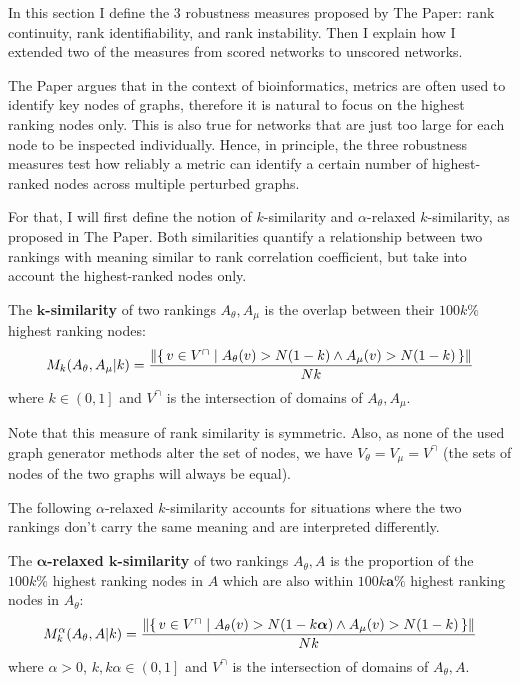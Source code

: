 In this section I define the 3 robustness measures proposed by The Paper: rank continuity, rank identifiability, and rank instability.
Then I explain how I extended two of the measures from scored networks to unscored networks.

The Paper argues that in the context of bioinformatics, metrics are often used to identify key nodes of graphs, therefore it is natural to focus on the highest ranking nodes only.
This is also true for networks that are just too large for each node to be inspected individually\citeneeded.
Hence, in principle, the three robustness measures test how reliably a metric can identify a certain number of highest-ranked nodes across multiple perturbed graphs.


For that, I will first define the notion of $k$-similarity and $\alpha$-relaxed $k$-similarity, as proposed in The Paper.
Both similarities quantify a relationship between two rankings with meaning similar to rank correlation coefficient, but take into account the highest-ranked nodes only.

\begin{definition}
    The \textbf{$\boldsymbol{k}$-similarity} of two rankings $A_\theta, A_\mu$ is the overlap between their $100k\%$ highest ranking nodes:
    \[ M_k(A_\theta, A_\mu | k) = \frac{\left\| \left\{\, v \in V^{\cap} \mid  A_\theta(v) > N(1-k) \wedge A_\mu(v) > N(1-k)  \, \right\} \right\|}{Nk} \]
    where $k \in \left( 0, 1 \right]$ and $V^{\cap}$ is the intersection of domains of $A_\theta, A_\mu$.
\end{definition}

Note that this measure of rank similarity is symmetric.
Also, as none of the used graph generator methods alter the set of nodes, we have $V_\theta = V_\mu = V^{\cap}$ (the sets of nodes of the two graphs will always be equal).

The following $\alpha$-relaxed $k$-similarity accounts for situations where the two rankings don't carry the same meaning and are interpreted differently.

\begin{definition}
    The \textbf{$\boldsymbol{\alpha}$-relaxed $\boldsymbol{k}$-similarity} of two rankings $A_\theta, A$ is the proportion of the $100k\%$ highest ranking nodes in $A$ which are also within $100k\boldsymbol{a}\%$ highest ranking nodes in $A_\theta$:
    \[ M_k^\alpha(A_\theta, A | k) = \frac{\left\| \left\{\, v \in V^{\cap} \mid  A_\theta(v) > N(1-k\boldsymbol{\alpha}) \wedge A_\mu(v) > N(1-k)  \, \right\} \right\|}{Nk} \]
    where $\alpha > 0$, $k, k\alpha \in \left( 0, 1 \right]$ and $V^{\cap}$ is the intersection of domains of $A_\theta, A$.
\end{definition}

